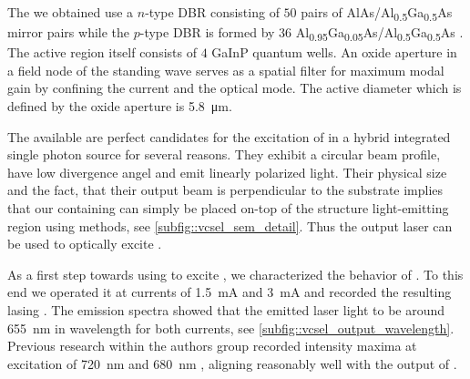 	The \VCSELs we obtained use a $n$-type DBR consisting of $50$ pairs of AlAs/Al\textsubscript{0.5}Ga\textsubscript{0.5}As mirror pairs while the $p$-type DBR is formed by $36$ Al\textsubscript{0.95}Ga\textsubscript{0.05}As/Al\textsubscript{0.5}Ga\textsubscript{0.5}As \cite{Weidenfeld2012}. The active region itself consists of $4$ GaInP quantum wells. An oxide aperture in a field node of the standing wave serves as a spatial filter for maximum modal gain by confining the current and the optical mode. The active diameter which is defined by the oxide aperture is \SI{5.8}{\micro\meter}.

	The available \VCSELs are perfect candidates for the excitation of \sivs in a hybrid integrated single photon source for several reasons. They exhibit a circular beam profile, have low divergence angel and emit linearly polarized light. Their physical size and the fact, that their output beam is perpendicular to the substrate implies that our \nds containing \nds can simply be placed on-top of the structure light-emitting region using \pp methods, see \autoref{subfig::vcsel_sem_detail}. Thus the \VCSELs output laser can be used to optically excite \sivs.

	As a first step towards using \VCSELs to excite \ccs, we characterized the behavior of \BmFour. To this end we operated it at currents of
	\SI{1.5}{\mA} and \SI{3}{\mA} and recorded the resulting lasing \wl. The emission spectra showed that the emitted \cw laser light to be around \SI{655}{\nm} in wavelength for both currents, see \autoref{subfig::vcsel_output_wavelength}. Previous research within the authors group recorded \siv intensity maxima at excitation \wls of \SI{720}{\nm} and \SI{680}{\nm} \cite{Incomplete master thesis of X} , aligning reasonably well with the output \wl of \BmFour.

